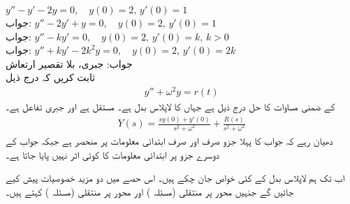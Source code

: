 \quad
$y''-y'-2y=0,\quad y(0)=2, \, y'(0)=1$\\
جواب:
\quad
$y''-2y'+y=0,\quad y(0)=2,\, y'(0)=1$\\
جواب:
\quad
$y''-ky'=0,\quad y(0)=2, \, y'(0)=k, \, k>0$\\
جواب:
\quad
$y''+ky'-2k^2y=0,\quad y(0)=2,\, y'(0)=2k$\\
جواب:
\quad جبری، بلا تقصیر ارتعاش\\
ثابت کریں کہ درج ذیل
\begin{align*}
y''+\omega^2y=r(t)
\end{align*}
کے ضمنی مساوات کا حل درج ذیل ہے جہاں  کا لاپلاس بدل  ہے۔   مستقل ہے اور  جبری تفاعل ہے۔
\begin{align*}
Y(s)=\frac{sy(0)+y'(0)}{s^2+\omega^2}+\frac{R(s)}{s^2+\omega^2}
\end{align*}
دھیان رہے کہ جواب کا پہلا جزو صرف اور صرف ابتدائی معلومات پر منحصر ہے جبکہ جواب کے دوسرے جزو پر ابتدائی معلومات کا کوئی اثر نہیں پایا جاتا ہے۔ 

اب تک ہم لاپلاس بدل کے کئی خواص جان چکے ہیں۔ اس حصے میں دو مزید خصوصیات پیش کیے جائیں گے جنہیں  محور پر منتقلی (مسئلہ ) اور  محور پر منتقلی (مسئلہ ) کہتے ہیں۔

